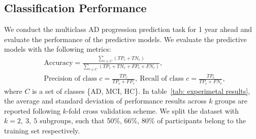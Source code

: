 \subsection{Classification Performance}
We conduct the multiclass AD progression prediction task for 1 year ahead and evaluate the performance of the predictive models. We evaluate the predictive models with the following metrics:
\begin{equation}\label{eq: metrics}
\begin{aligned}
    &\text{Accuracy} = \frac{\sum_{c \in C}(TP_c + TN_c)}{\sum_{c \in C}(TP_c + TN_c + FP_c + FN_c)},\\
    &\text{Precision of class }c=\frac{TP_c}{TP_c + FP_c},\ \text{Recall of class }c=\frac{TP_c}{TP_c+FN_c},
\end{aligned}
\end{equation}
where $C$ is a set of classes \{AD, MCI, HC\}.
In table~\ref{tab: experimetal results}, the average and standard deviation of performance results across $k$ groups are reported following $k$-fold cross validation scheme. We split the dataset with $k=2,\ 3,\ 5$ subgroups, such that 50\%, 66\%, 80\% of participants belong to the training set respectively.
